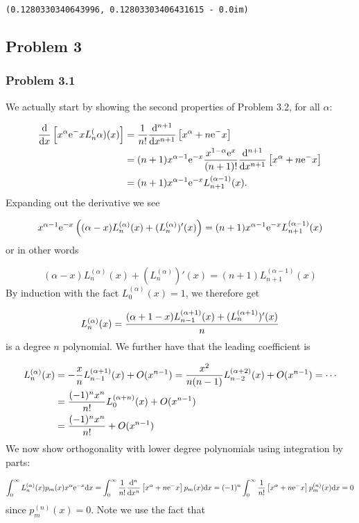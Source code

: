 \documentclass[12pt,landscape]{article}
\def\D{ {\rm d} }
\def\E{ {\rm e} }
\def\addtab#1={#1\;&=}
\def\ccr{\\\addtab}
\def\dx{\D x}
\def\pr(#1){\left({#1}\right)}
\def\br[#1]{\left[{#1}\right]}
\def\addtab#1={#1\;&=}
\def\ccr{\\\addtab}
\begin{document}
{\begin{lstlisting}
(0.1280330340643996, 0.12803303406431615 - 0.0im)
\end{lstlisting}


\subsection{Problem 3}
\subsubsection{Problem 3.1}
We actually start by showing the second properties of Problem 3.2, for all $\alpha$:


\begin{align*}
{\D \over \dx} \br[x^\alpha \E^{-x} L_n^{(\alpha)}(x)] &= {1 \over n!}  {\D^{n+1} \over \dx^{n+1}}\br[x^{\alpha+n}\E^{-x}] \ccr
= (n+1)x^{\alpha-1}\E^{-x}  {x^{1-\alpha} \E^{x} \over (n+1)!}{ \D^{n+1} \over \dx^{n+1}}\br[x^{\alpha+n}\E^{-x}] \ccr
= (n+1) x^{\alpha-1}\E^{-x} L_{n+1}^{(\alpha-1)}(x).
\end{align*}
Expanding out the derivative we see

\[
x^{\alpha-1} \E^{-x}\pr({(\alpha -x)L_n^{(\alpha)}(x) + (L_n^{(\alpha)})'(x)}) = (n+1) x^{\alpha-1}\E^{-x} L_{n+1}^{(\alpha-1)}(x)
\]
or in other words

\[
(\alpha -x)L_n^{(\alpha)}(x) + (L_n^{(\alpha)})'(x) = (n+1) L_{n+1}^{(\alpha-1)}(x)
\]
By induction with the fact $L_0^{(\alpha)}(x) = 1$, we therefore get

\[
L_n^{(\alpha)}(x) = {(\alpha+1 -x)L_{n-1}^{(\alpha+1)}(x) + (L_n^{(\alpha+1)})'(x) \over n}
\]
is a degree $n$ polynomial. We further have that the leading coefficient is


\begin{align*}
L_n^{(\alpha)}(x) &= -{x \over n} L_{n-1}^{(\alpha+1)}(x) +O(x^{n-1}) =   {x^2 \over n(n-1)} L_{n-2}^{(\alpha+2)}(x) +O(x^{n-1}) = \cdots \ccr
= {(-1)^n x^n \over n!} L_0^{(\alpha+n)}(x) +O(x^{n-1}) \\
&= {(-1)^n x^n \over n!} +O(x^{n-1})
\end{align*}
We now show orthogonality with lower degree polynomials using integration by parts:

\[
\int_0^\infty L_n^{(\alpha)}(x) p_m(x) x^\alpha \E^{-x} \dx =
\int_0^\infty  {1 \over n!} {\D^n \over \dx^n}\br[x^{\alpha+n}\E^{-x}]  p_m(x)  \dx = (-1)^n \int_0^\infty  {1 \over n!} \br[x^{\alpha+n}\E^{-x}]  p_m^{(n)}(x)  \dx = 0
\]
since $p_m^{(n)}(x) = 0$. Note we use the fact that

}
\end{document}
